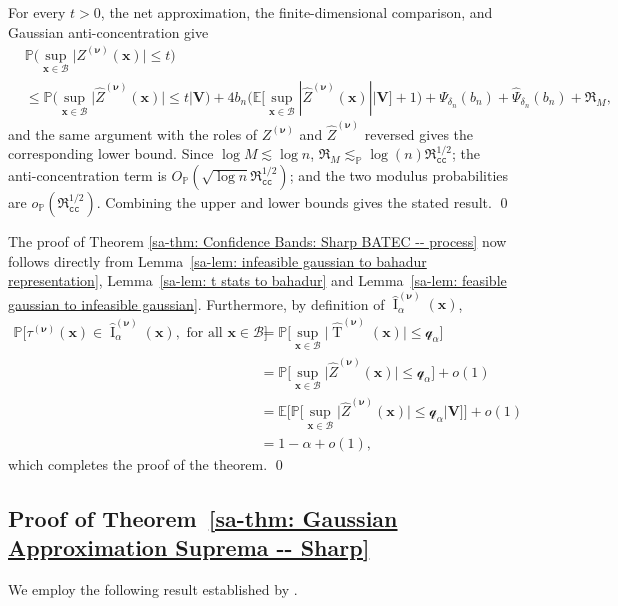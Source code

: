 \documentclass[10pt]{article}
\DeclareMathOperator{\Tstat}{T}
\DeclareMathOperator{\CI}{I}
\renewcommand{\P}{\mathbb{P}}
\newcommand{\E}{\mathbb{E}}
\newcommand{\lessp}{\lesssim_{\mathbb{P}}}
\newcommand{\bV}{\mathbf{V}}
\newcommand{\bx}{\mathbf{x}}
\newcommand{\bnu}{\boldsymbol{\nu}}
\newcommand{\B}{\mathcal{B}}
\newcommand{\q}{\mathcal{q}}
\begin{document}
For every $t>0$, the net approximation, the finite-dimensional comparison, and Gaussian anti-concentration give
\begin{align*}
    &\P \Big( \sup_{\bx \in \B} \big|Z^{(\bnu)}(\bx)\big| \leq t \Big)\\
    &\leq \P \Big( \sup_{\bx \in \B} \big|\widehat{Z}^{(\bnu)}(\bx)\big| \leq t \Big| \bV \Big)
       +4b_n\Big(\E\Big[\sup_{\bx\in\B}|\widehat Z^{(\bnu)}(\bx)|\Big|\bV\Big]+1\Big)
       +\Psi_{\delta_n}(b_n)+\widehat\Psi_{\delta_n}(b_n)+\mathfrak R_M,
\end{align*}
and the same argument with the roles of $Z^{(\bnu)}$ and $\widehat Z^{(\bnu)}$ reversed gives the corresponding lower bound. Since $\log M\lesssim \log n$, $\mathfrak R_M\lessp \log(n)\mathfrak{R}_{\mathtt{cc}}^{1/2}$; the anti-concentration term is $O_{\P}(\sqrt{\log n}\mathfrak{R}_{\mathtt{cc}}^{1/2})$; and the two modulus probabilities are $o_{\P}(\mathfrak{R}_{\mathtt{cc}}^{1/2})$. Combining the upper and lower bounds gives the stated result.
\qed


\bigskip
The proof of Theorem \ref{sa-thm: Confidence Bands: Sharp BATEC -- process} now follows directly from Lemma~\ref{sa-lem: infeasible gaussian to bahadur representation}, Lemma~\ref{sa-lem: t stats to bahadur} and Lemma~\ref{sa-lem: feasible gaussian to infeasible gaussian}. Furthermore, by definition of $\widehat{\CI}_{\alpha}^{(\bnu)}(\bx)$,
\begin{align*}
    \P\Big[\tau^{(\bnu)}(\bx) \in \widehat{\CI}_{\alpha}^{(\bnu)}(\bx), \text{ for all } \bx \in \B \Big]
    & = \P \Big[\sup_{\bx \in \B} \big|\widehat{\Tstat}^{(\bnu)}(\bx)\big| \leq \q_{\alpha}\Big] \\
    & = \P \Big[\sup_{\bx \in \B} \big|\widehat{Z}^{(\bnu)}(\bx)\big|\leq \q_{\alpha}\Big] + o(1) \\
    & = \E \Big[\P \Big[\sup_{\bx \in \B} \big|\widehat{Z}^{(\bnu)}(\bx)\big| \leq \q_{\alpha}\Big| \bV \Big]\Big] + o(1) \\
    & = 1 - \alpha + o(1),
\end{align*}
which completes the proof of the theorem.
\qed

\subsection{Proof of Theorem~\ref{sa-thm: Gaussian Approximation Suprema -- Sharp}}

We employ the following result established by \citet[Corollary 2.2]{Chernozhukov-Chetverikov-Kato_2014b_AoS}.
\end{document}
